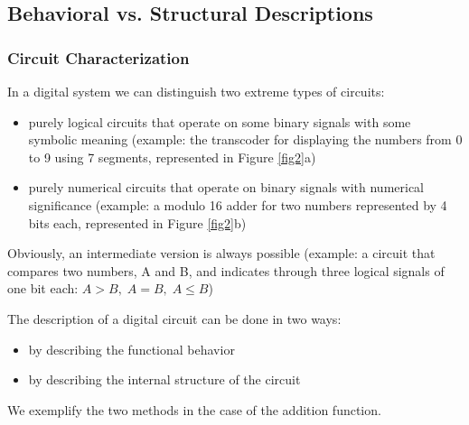 \subsection{Behavioral vs. Structural Descriptions}
\subsubsection{Circuit Characterization}

In a digital system we can distinguish two extreme types of circuits:
\begin{itemize}
\item purely logical circuits that operate on some binary signals with some symbolic meaning (example: the transcoder for displaying the numbers from 0 to 9 using 7 segments, represented in Figure \ref{fig2}a)

\item purely numerical circuits that operate on binary signals with numerical significance (example: a modulo 16 adder for two numbers represented by 4 bits each, represented in Figure \ref{fig2}b)
\end{itemize}
Obviously, an intermediate version is always possible (example: a circuit that compares two numbers, A and B, and indicates through three logical signals of one bit each: $A>B, \; A=B, \; A\leq B$)



The description of a digital circuit can be done in two ways:
\begin{itemize}
\item  by describing the functional behavior
\item  by describing the internal structure of the circuit
\end{itemize}
We exemplify the two methods in the case of the addition function.


